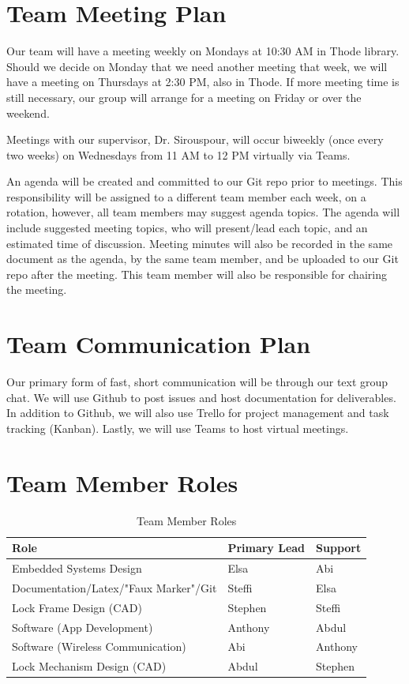 \documentclass{article}
\begin{document}
\section{Team Meeting Plan}

Our team will have a meeting weekly on Mondays at 10:30 AM in Thode library.  Should we decide on Monday that we need another meeting that week, we will have a meeting on Thursdays at 2:30 PM, also in Thode.  If more meeting time is still necessary, our group will arrange for a meeting on Friday or over the weekend.

Meetings with our supervisor, Dr. Sirouspour, will occur biweekly (once every two weeks) on Wednesdays from 11 AM to 12 PM virtually via Teams.

An agenda will be created and committed to our Git repo prior to meetings.  This responsibility will be assigned to a different team member each week, on a rotation, however, all team members may suggest agenda topics.  The agenda will include suggested meeting topics, who will present/lead each topic, and an estimated time of discussion. Meeting minutes will also be recorded in the same document as the agenda, by the same team member, and be uploaded to our Git repo after the meeting.  This team member will also be responsible for chairing the meeting. 

\section{Team Communication Plan}

Our primary form of fast, short communication will be through our text group chat. We will use Github to post issues and host documentation for deliverables.  In addition to Github, we will also use Trello for project management and task tracking (Kanban).  Lastly, we will use Teams to host virtual meetings.

\section{Team Member Roles}

\begin{table}[h]
\caption{Team Member Roles} \label{TblTeamMemberRoles}
\begin{tabularx}{\textwidth}{llX}
\toprule
\textbf{Role} & \textbf{Primary Lead} & \textbf{Support}\\
\midrule
Embedded Systems Design & Elsa & Abi\\
Documentation/Latex/"Faux Marker"/Git & Steffi & Elsa\\
Lock Frame Design (CAD) & Stephen & Steffi\\
Software (App Development) & Anthony & Abdul\\
Software (Wireless Communication) & Abi & Anthony\\
Lock Mechanism Design (CAD) & Abdul & Stephen\\
\bottomrule
\end{tabularx}
\end{table}
\end{document}
